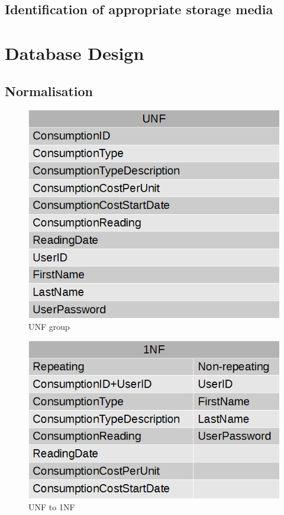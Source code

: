 \subsection{Identification of appropriate storage media}

\section{Database Design}

\subsection{Normalisation}
\begin{figure}[H]
\includegraphics{./design/UNF.png}
\caption{UNF group}
\end{figure}

\begin{figure}[H]
\includegraphics{./design/1NF.png}
\caption{UNF to 1NF}
\end{figure}

